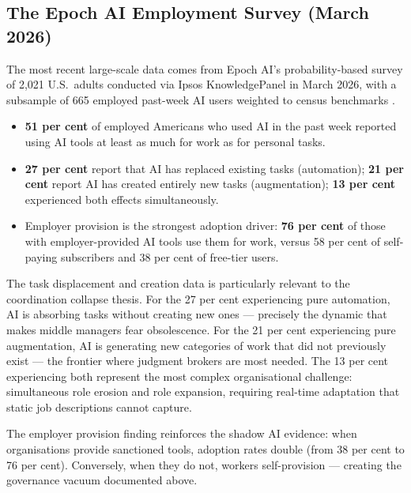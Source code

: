 \subsection{The Epoch AI Employment Survey (March 2026)}

The most recent large-scale data comes from Epoch AI's probability-based survey of 2,021 U.S.\ adults conducted via Ipsos KnowledgePanel in March 2026, with a subsample of 665 employed past-week AI users weighted to census benchmarks \parencite{EpochAI2026}.

\begin{evidencebox}[title={AI as Mainstream Work Tool (Epoch AI, March 2026)}]
\begin{itemize}
  \item \textbf{51 per cent} of employed Americans who used AI in the past week reported using AI tools at least as much for work as for personal tasks.
  \item \textbf{27 per cent} report that AI has replaced existing tasks (automation); \textbf{21 per cent} report AI has created entirely new tasks (augmentation); \textbf{13 per cent} experienced both effects simultaneously.
  \item Employer provision is the strongest adoption driver: \textbf{76 per cent} of those with employer-provided AI tools use them for work, versus 58 per cent of self-paying subscribers and 38 per cent of free-tier users.
\end{itemize}
\end{evidencebox}

The task displacement and creation data is particularly relevant to the coordination collapse thesis. For the 27 per cent experiencing pure automation, AI is absorbing tasks without creating new ones --- precisely the dynamic that makes middle managers fear obsolescence. For the 21 per cent experiencing pure augmentation, AI is generating new categories of work that did not previously exist --- the frontier where judgment brokers are most needed. The 13 per cent experiencing both represent the most complex organisational challenge: simultaneous role erosion and role expansion, requiring real-time adaptation that static job descriptions cannot capture.

The employer provision finding reinforces the shadow AI evidence: when organisations provide sanctioned tools, adoption rates double (from 38 per cent to 76 per cent). Conversely, when they do not, workers self-provision --- creating the governance vacuum documented above.

